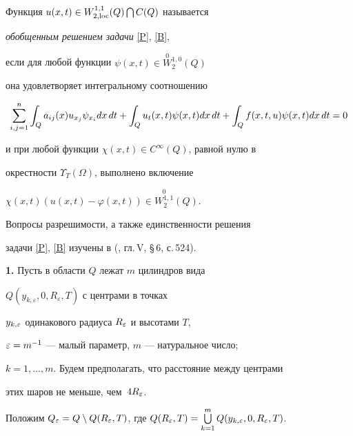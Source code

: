\begin{defn}


Функция $u(x,t)\in W^{1,1}_{2,\operatorname{loc}}(Q)\bigcap C(Q)$ называется


{\it обобщенным решением задачи} \eqref{P}, \eqref{B},


если для любой функции $\psi(x,t)\in\overset{0}{W}{}_{2}^{1,0}(Q)$


она удовлетворяет интегральному соотношению


\begin{equation}


\stdsum\int_{Q} a_{ij}(x) u_{x_j} \psi_{x_i}


dx\,dt+\int_{Q} u_t(x,t)\psi(x,t)dx\,dt+\int_{Q}


f(x,t,u)\psi(x,t) dx\,dt=0 \label{ii}


\end{equation}


и при любой функции $\chi(x,t)\in C^\infty(Q)$, равной нулю в


окрестности $\Upsilon_T(\Omega)$, выполнено включение


$\chi(x,t)(u(x,t)-\varphi(x,t))\in\stackrel{0}{W_2^{1,1}}(Q)$.


\end{defn}





Вопросы разрешимости, а также единственности решения


задачи \eqref{P}, \eqref{B} изучены в (\cite{LSU}, гл.\,V, \S\,6, с.\,524).


\medskip





{\bf 1.} Пусть в области $Q$ лежат $m$ цилиндров вида


$Q(y_{k,\varepsilon},0, R_\varepsilon,T)$ с центрами в точках


$y_{k,\varepsilon}$ одинакового радиуса $R_{\varepsilon}$ и высотами $T$,


$\varepsilon=m^{-1}$ --- малый параметр, $m$ --- натуральное число;


$k=1,\dotsc,m$. Будем предполагать, что расстояние между центрами


этих шаров не меньше, чем~$4R_\varepsilon$.


Положим $Q_\eps=Q \setminus Q(R_\eps, T)$, где $Q(R_\eps,


T)=\bigcup\limits_{k=1}^m Q(y_{k,\varepsilon},0,


R_\varepsilon,T)$.





